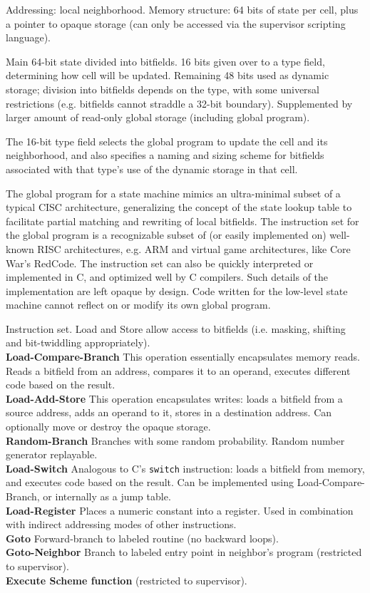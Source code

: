 \documentclass{acm_proc_article-sp}
\begin{document}
Addressing: local neighborhood.
Memory structure: 64 bits of state per cell, plus a pointer to opaque storage (can only be accessed via the supervisor scripting language).

Main 64-bit state divided into bitfields. 16 bits given over to a type field, determining how cell will be updated.
Remaining 48 bits used as dynamic storage; division into bitfields depends on the type, with some universal restrictions (e.g. bitfields cannot straddle a 32-bit boundary).
Supplemented by larger amount of read-only global storage (including global program).

The 16-bit type field selects the global program to update the cell and its neighborhood,
and also specifies a naming and sizing scheme for bitfields associated with that type's use of the dynamic storage in that cell.

The global program for a state machine mimics an ultra-minimal subset of a typical CISC architecture, generalizing the concept of the state lookup table to facilitate partial matching and rewriting of local bitfields.
The instruction set for the global program is a recognizable subset of (or easily implemented on) well-known RISC architectures, e.g. ARM\cite{seal00} and virtual game architectures, like Core War's RedCode\cite{CoreWarGuidelines84}.
The instruction set can also be quickly interpreted or implemented in C, and optimized well by C compilers.
Such details of the implementation are left opaque by design.
Code written for the low-level state machine cannot reflect on or modify its own global program.

Instruction set.
Load and Store allow access to bitfields (i.e. masking, shifting and bit-twiddling appropriately).
\\
{\bf Load-Compare-Branch} This operation essentially encapsulates memory reads. Reads a bitfield from an address, compares it to an operand, executes different code based on the result.
\\
{\bf Load-Add-Store} This operation encapsulates writes: loads a bitfield from a source address, adds an operand to it, stores in a destination address. Can optionally move or destroy the opaque storage.
\\
{\bf Random-Branch} Branches with some random probability. Random number generator replayable.
\\
{\bf Load-Switch} Analogous to C's {\tt switch} instruction: loads a bitfield from memory, and executes code based on the result. Can be implemented using Load-Compare-Branch, or internally as a jump table.
\\
{\bf Load-Register} Places a numeric constant into a register. Used in combination with indirect addressing modes of other instructions.
\\
{\bf Goto} Forward-branch to labeled routine (no backward loops).
\\
{\bf Goto-Neighbor} Branch to labeled entry point in neighbor's program (restricted to supervisor).
\\
{\bf Execute Scheme function} (restricted to supervisor).
\end{document}
